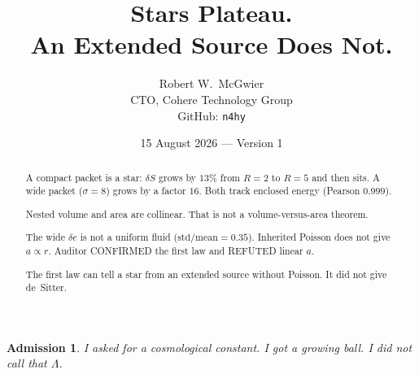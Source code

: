 \documentclass[11pt]{article}
\title{\textbf{Stars Plateau.\\
An Extended Source Does Not.}}
\author{Robert W.\ McGwier\\
\small CTO, Cohere Technology Group\\
\small GitHub: \texttt{n4hy}}
\date{15 August 2026 --- Version 1}
\newtheorem*{admission}{Admission}
\begin{document}
\maketitle

\begin{abstract}
\noindent
A compact packet is a star: $\delta S$ grows by $13\%$
from $R=2$ to $R=5$ and then sits. A wide packet
($\sigma=8$) grows by a factor $16$. Both track
enclosed energy (Pearson $0.999$).

Nested volume and area are collinear. That is not a
volume-versus-area theorem.

The wide $\delta e$ is not a uniform fluid
($\mathrm{std}/\mathrm{mean}=0.35$). Inherited Poisson
does not give $a\propto r$. Auditor CONFIRMED the first
law and REFUTED linear $a$.

The first law can tell a star from an extended source
without Poisson. It did not give de~Sitter.
\end{abstract}

\begin{admission}
I asked for a cosmological constant. I got a growing
ball. I did not call that $\Lambda$.
\end{admission}
\end{document}
